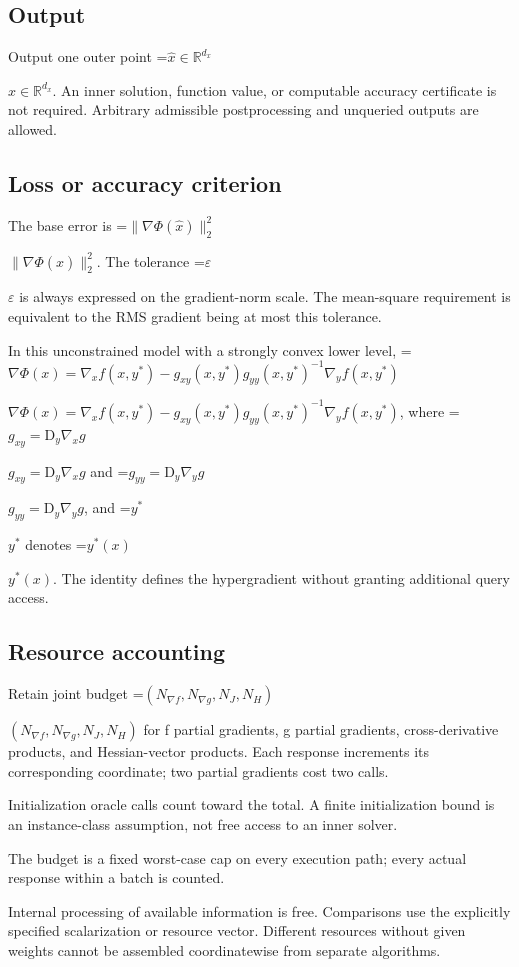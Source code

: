 \documentclass[10pt,a4paper]{article}
\newcommand{\AtlasMath}[1]{\par\begingroup\centering\setbox0=\hbox{$\displaystyle #1$}\ifdim\wd0>1.4\linewidth\typeout{ATLAS WIDE FORMULA: \the\wd0}\fi\ifdim\wd0>\linewidth\resizebox{\linewidth}{!}{\box0}\else\box0\fi\par\endgroup}
\newcommand{\AtlasInlineMath}[1]{\begingroup\setbox0=\hbox{$#1$}\ifdim\wd0>.4\linewidth\endgroup\AtlasMath{#1}\else\endgroup$#1$\fi}
\begin{document}
\subsection{Output}
Output one outer point \AtlasInlineMath{\widehat{x}\in\mathbb{R}^{d_x}}. An inner solution, function value, or computable accuracy certificate is not required. Arbitrary admissible postprocessing and unqueried outputs are allowed.

\subsection{Loss or accuracy criterion}
The base error is \AtlasInlineMath{\|\nabla\Phi(\widehat{x})\|_2^2}. The tolerance \AtlasInlineMath{\varepsilon} is always expressed on the gradient-norm scale. The mean-square requirement is equivalent to the RMS gradient being at most this tolerance.

In this unconstrained model with a strongly convex lower level, \AtlasInlineMath{\nabla\Phi(x)=\nabla_x f(x,y^*)-g_{xy}(x,y^*)g_{yy}(x,y^*)^{-1}\nabla_y f(x,y^*)}, where \AtlasInlineMath{g_{xy}=\mathrm{D}_y\nabla_x g} and \AtlasInlineMath{g_{yy}=\mathrm{D}_y\nabla_y g}, and \AtlasInlineMath{y^*} denotes \AtlasInlineMath{y^*(x)}. The identity defines the hypergradient without granting additional query access.

\subsection{Resource accounting}
Retain joint budget \AtlasInlineMath{(N_{\nabla f},N_{\nabla g},N_J,N_H)} for f partial gradients, g partial gradients, cross-derivative products, and Hessian-vector products. Each response increments its corresponding coordinate; two partial gradients cost two calls.

Initialization oracle calls count toward the total. A finite initialization bound is an instance-class assumption, not free access to an inner solver.

The budget is a fixed worst-case cap on every execution path; every actual response within a batch is counted.

Internal processing of available information is free. Comparisons use the explicitly specified scalarization or resource vector. Different resources without given weights cannot be assembled coordinatewise from separate algorithms.
\end{document}
